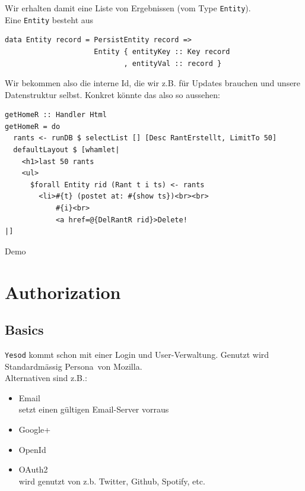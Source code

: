 \documentclass{beamer}
\begin{document}
\begin{frame}[fragile]
Wir erhalten damit eine Liste von Ergebnissen (vom Type \texttt{Entity}).\\\pause
Eine \texttt{Entity} besteht aus
\begin{verbatim}
data Entity record = PersistEntity record =>
                     Entity { entityKey :: Key record
                            , entityVal :: record }
\end{verbatim}
\pause
Wir bekommen also die interne Id, die wir z.B. für Updates brauchen und unsere Datenstruktur selbst. Konkret könnte das also so aussehen:
\begin{verbatim}
getHomeR :: Handler Html
getHomeR = do
  rants <- runDB $ selectList [] [Desc RantErstellt, LimitTo 50]
  defaultLayout $ [whamlet|
    <h1>last 50 rants
    <ul>
      $forall Entity rid (Rant t i ts) <- rants
        <li>#{t} (postet at: #{show ts})<br><br>
            #{i}<br>
            <a href=@{DelRantR rid}>Delete!
|]
\end{verbatim}
\end{frame}

\begin{frame}
Demo
\end{frame}

\section{Authorization}

\subsection{Basics}

\begin{frame}[fragile]
\texttt{Yesod} kommt schon mit einer Login und User-Verwaltung. Genutzt wird Standardmässig \glqq Persona\grqq \ von Mozilla.\\\pause
Alternativen sind z.B.:
\begin{itemize}
 \item Email\\
       setzt einen gültigen Email-Server vorraus
 \pause
 \item Google+
 \pause
 \item OpenId
 \pause
 \item OAuth2\\
       wird genutzt von z.b. Twitter, Github, Spotify, etc.
\end{itemize}
\end{frame}
\end{document}
